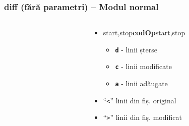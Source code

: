 \documentclass{beamer}
\begin{document}
\begin{frame}
  \frametitle{\textbf{diff} (fără parametri) – Modul normal}
  \begin{columns}

    \begin{column}{7cm}
      \tt 
    \end{column}

    \begin{column}{10cm}
      \begin{itemize}
      \item start,stop\textbf{codOp}start,stop
        \begin{itemize}
        \item \textbf{\texttt{d}} - linii șterse
        \item \textbf{\texttt{c}} - linii modificate
        \item \textbf{\texttt{a}} - linii adăugate
        \end{itemize}
      \item ``\texttt{\textless}''  linii din fiș. original
      \item ``\texttt{\textgreater}'' linii din fiș. modificat
      \end{itemize}
    \end{column}

  \end{columns}
\end{frame}
\end{document}
